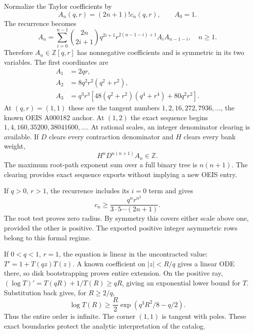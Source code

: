 Normalize the Taylor coefficients by
\[
A_n(q,r)=(2n+1)!c_n(q,r),\qquad A_0=1.
\]
The recurrence becomes
\[
\boxed{A_n=\sum_{i=0}^{n-1}\binom{2n}{2i+1}
q^{2i+1}r^{2(n-1-i)+1}A_iA_{n-1-i},\quad n\ge1.}
\]
Therefore $A_n\in\mathbb Z[q,r]$ has nonnegative coefficients and is
symmetric in its two variables. The first coordinates are
\[
\begin{aligned}
A_1&=2qr,\\
A_2&=8q^2r^2(q^2+r^2),\\
A_3&=q^3r^3[48(q^2+r^2)(q^4+r^4)+80q^2r^2].
\end{aligned}
\]
At $(q,r)=(1,1)$ these are the tangent numbers
$1,2,16,272,7936,\ldots$, the known OEIS A000182 anchor.
At $(1,2)$ the exact sequence begins
$1,4,160,35200,38041600,\ldots$.
At rational scales, an integer denominator clearing is available. If $D$
clears every contraction denominator and $H$ clears every bank weight,
\[
H^nD^{n(n+1)}A_n\in\mathbb Z.
\]
The maximum root-path exponent sum over a full binary tree is $n(n+1)$.
The clearing provides exact sequence exports without implying a new OEIS entry.

If $q>0$, $r>1$, the recurrence includes its $i=0$ term and gives
\[
c_n\ge\frac{q^nr^{n^2}}{3\cdot5\cdots(2n+1)}.
\]
The root test proves zero radius. By symmetry this covers either scale above
one, provided the other is positive. The exported positive integer asymmetric
rows belong to this formal regime.

If $0<q<1$, $r=1$, the equation is linear in the uncontracted value:
$T'=1+T(qz)T(z)$. A known coefficient on $|z|<R/q$ gives a linear ODE
there, so disk bootstrapping proves entire extension. On the positive ray,
$(\log T)'=T(qR)+1/T(R)\ge qR$, giving an exponential lower bound for
$T$. Substitution back gives, for $R\ge2/q$,
\[
\log T(R)\ge\frac R2\exp(q^3R^2/8-q/2).
\]
Thus the entire order is infinite. The corner $(1,1)$ is tangent with poles.
These exact boundaries protect the analytic interpretation of the catalog.

